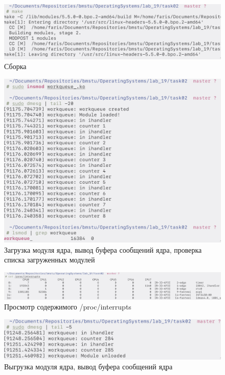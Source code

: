\begin{figure}[H]
    \centering
    \caption{Сборка}
    \includegraphics[scale=0.375]{images/scr2_1.png}
\end{figure}
\begin{figure}[H]
    \centering
    \caption{Загрузка модуля ядра, вывод буфера сообщений ядра, проверка списка загруженных модулей}
    \includegraphics[scale=0.375]{images/scr2_2.png}
\end{figure}
\begin{figure}[H]
    \centering
    \caption{Просмотр содержимого /proc/interrupts}
    \includegraphics[scale=0.235]{images/scr2_3.png}
\end{figure}
\begin{figure}[H]
    \centering
    \caption{Выгрузка модуля ядра, вывод буфера сообщений ядра}
    \includegraphics[scale=0.375]{images/scr2_4.png}
\end{figure}
